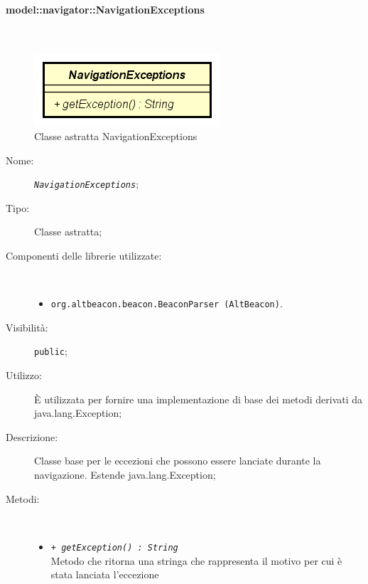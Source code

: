 \documentclass[../DefinizioneDiProdotto.tex]{subfiles}
\begin{document}
\paragraph{model::navigator::NavigationExceptions}
\
\begin{figure}[H]
	\centering
	\includegraphics[width=\maxwidth]{img/NavigationExceptions.png}
	\caption{Classe astratta NavigationExceptions}\label{fig:model::navigator::NavigationExceptions} 
\end{figure}
\begin{description}
	\item[Nome:] \texttt{\textit{NavigationExceptions}};
	\item[Tipo:] Classe astratta;
	\item[Componenti delle librerie utilizzate:] \
	\begin{itemize}
		\item \texttt{org.altbeacon.beacon.BeaconParser (AltBeacon)}.
		
	\end{itemize}
	\item[Visibilità:] \texttt{public};
	\item[Utilizzo:] È utilizzata per fornire una implementazione di base dei metodi derivati da java.lang.Exception;
	\item[Descrizione:] Classe base per le eccezioni che possono essere lanciate durante la navigazione. Estende java.lang.Exception;
	\item[Metodi:] \
	\begin{itemize}
		\item \texttt{+ \textit{getException() : String}}\\
		Metodo che ritorna una stringa che rappresenta il motivo per cui è stata lanciata l'eccezione
	\end{itemize}
\end{description}
\end{document}
